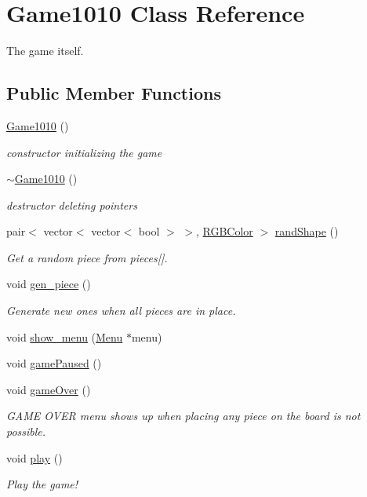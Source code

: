 \hypertarget{class_game1010}{}\section{Game1010 Class Reference}
\label{class_game1010}


The game itself.  


\subsection*{Public Member Functions}
\begin{DoxyCompactItemize}
\item 
\mbox{\hyperlink{class_game1010_a0a0688219844edbe8f4a44c11a13e32a}{Game1010}} ()
\begin{DoxyCompactList}\small\item\em constructor initializing the game \end{DoxyCompactList}\item 
\mbox{\hyperlink{class_game1010_abcdf29a3fb425ad389e247f241ee4ed5}{$\sim$\+Game1010}} ()
\begin{DoxyCompactList}\small\item\em destructor deleting pointers \end{DoxyCompactList}\item 
pair$<$ vector$<$ vector$<$ bool $>$ $>$, \mbox{\hyperlink{class_r_g_b_color}{R\+G\+B\+Color}} $>$ \mbox{\hyperlink{class_game1010_a9b86f7bf4ad3af111014ad33a781ffe5}{rand\+Shape}} ()
\begin{DoxyCompactList}\small\item\em Get a random piece from pieces\mbox{[}\mbox{]}. \end{DoxyCompactList}\item 
void \mbox{\hyperlink{class_game1010_a9576170947a355682c922cb648432b9e}{gen\+\_\+piece}} ()
\begin{DoxyCompactList}\small\item\em Generate new ones when all pieces are in place. \end{DoxyCompactList}\item 
void \mbox{\hyperlink{class_game1010_a99d6f53c3073861fe37ef67caa073840}{show\+\_\+menu}} (\mbox{\hyperlink{class_menu}{Menu}} $\ast$menu)
\item 
void \mbox{\hyperlink{class_game1010_ab9c6def8a07ae00b55bd9b51f407eecd}{game\+Paused}} ()
\item 
void \mbox{\hyperlink{class_game1010_a3bc296b7ba6bffeda3baceb1240190b6}{game\+Over}} ()
\begin{DoxyCompactList}\small\item\em G\+A\+ME O\+V\+ER menu shows up when placing any piece on the board is not possible. \end{DoxyCompactList}\item 
void \mbox{\hyperlink{class_game1010_afa18a3a81b8966417a228459a5bebf53}{play}} ()
\begin{DoxyCompactList}\small\item\em Play the game! \end{DoxyCompactList}\end{DoxyCompactItemize}


